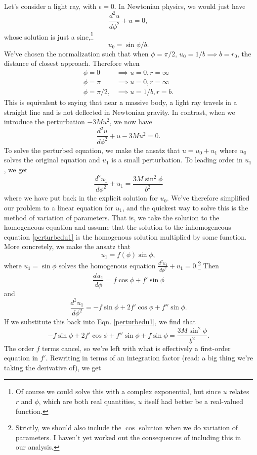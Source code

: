 Let's consider a light ray, with $\epsilon=0$. In Newtonian physics, we would just have
$$\frac{d^2u}{d\phi^2}+u=0,$$ whose solution is just a sine,\footnote{Of course we could solve this with a complex exponential, but since $u$ relates $r$ and $\phi$, which are both real quantities, $u$ itself had better be a real-valued function.} $$u_0=\sin\phi/b.$$ We've chosen the normalization such that when $\phi=\pi/2$, $u_0=1/b\implies b=r_0$, the distance of closest approach. Therefore when
\begin{align*}
    \phi=0 &\implies u=0,r=\infty\\
    \phi=\pi &\implies u=0, r=\infty\\
    \phi=\pi/2, &\implies u=1/b, r=b.
\end{align*}
This is equivalent to saying that near a massive body, a light ray travels in a straight line and is not deflected in Newtonian gravity. In contrast, when we introduce the perturbation $-3Mu^2$, we now have
\begin{equation}
\frac{d^2u}{d\phi^2}+u-3Mu^2=0.
\end{equation}
To solve the perturbed equation, we make the ansatz that $u=u_0+u_1$ where $u_0$ solves the original equation and $u_1$ is a small perturbation. To leading order in $u_1$, we get
\begin{equation}\label{perturbedu1}
\frac{d^2u_1}{d\phi^2}+u_1=\frac{3M\sin^2\phi}{b^2}
\end{equation}
where we have put back in the explicit solution for $u_0$.
We've therefore simplified our problem to a linear equation for $u_1$, and the quickest way to solve this is the method of variation of parameters. That is, we take the solution to the homogeneous equation and assume that the solution to the inhomogeneous equation \ref{perturbedu1} is the homogenous solution multiplied by some function. More concretely, we make the ansatz that $$u_1=f(\phi)\sin\phi,$$ where $u_1=\sin\phi$ solves the homogenous equation $\frac{d^2u_1}{d\phi^2}+u_1=0$.\footnote{Strictly, we should also include the $\cos$ solution when we do variation of parameters. I haven't yet worked out the consequences of including this in our analysis.} Then
$$\frac{du_1}{d\phi}=f\cos\phi+f' \sin\phi$$
and
$$\frac{d^2u_1}{d\phi^2}=-f\sin\phi+2f' \cos\phi+f''\sin\phi.$$
If we substitute this back into Eqn. \ref{perturbedu1}, we find that
$$-f\sin\phi+2f'\cos\phi+f''\sin\phi+f\sin\phi=\frac{3M\sin^2\phi}{b^2}.$$
The order $f$ terms cancel, so we're left with what is effectively a first-order equation in $f'$. Rewriting in terms of an integration factor (read: a big thing we're taking the derivative of), we get

